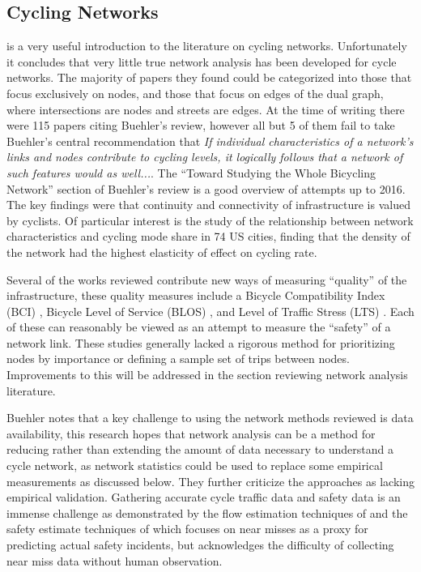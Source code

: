 \subsection{Cycling Networks}

\textcite{buehler2016bikeway} is a very useful introduction to the literature on cycling networks. Unfortunately it concludes that very little true network analysis has been developed for cycle networks. The majority of papers they found could be categorized into those that focus exclusively on nodes, and those that focus on edges of the dual graph, where intersections are nodes and streets are edges. At the time of writing there were 115 papers citing Buehler's review, however all but 5 of them fail to take Buehler's central recommendation that \textit{If individual characteristics of a network's links and nodes contribute to cycling levels, it logically follows that a network of such features would as well...}. The ``Toward Studying the Whole Bicycling Network'' section of Buehler's review is a good overview of attempts up to 2016. The key findings were that continuity and connectivity of infrastructure is valued by cyclists. Of particular interest is the \textcite{schoner2014missing} study of the relationship between network characteristics and cycling mode share in 74 US cities, finding that the density of the network had the highest elasticity of effect on cycling rate. 

Several of the works reviewed contribute new ways of measuring ``quality'' of the infrastructure, these quality measures include a Bicycle Compatibility Index (BCI) \parencite{klobucar2007network},  Bicycle Level of Service (BLOS) \parencite{lowry2012assessment}, and Level of Traffic Stress (LTS) \parencite{mekuria2012low}. Each of these can reasonably be viewed as an attempt to measure the ``safety'' of a network link. These studies generally lacked a rigorous method for prioritizing nodes by importance or defining a sample set of trips between nodes. Improvements to this will be addressed in the section reviewing network analysis literature. 

Buehler notes that a key challenge to using the network methods reviewed is data availability, this research hopes that network analysis can be a method for reducing rather than extending the amount of data necessary to understand a cycle network, as network statistics could be used to replace some empirical measurements as discussed below.  They further criticize the approaches as lacking empirical validation. Gathering accurate cycle traffic data and safety data is an immense challenge as demonstrated by the flow estimation techniques of \textcite{gosse2014estimating} and the safety estimate techniques of \textcite{puchades2018role} which focuses on near misses as a proxy for predicting actual safety incidents, but acknowledges the difficulty of collecting near miss data without human observation. 

